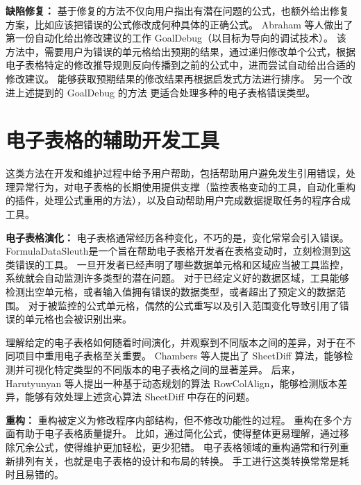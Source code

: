 

\textbf{缺陷修复：}
基于修复的方法不仅向用户指出有潜在问题的公式，也额外给出修复方案，比如应该把错误的公式修改成何种具体的正确公式。
Abraham 等人\cite{abraham2005goal}做出了第一份自动化给出修改建议的工作 GoalDebug（以目标为导向的调试技术）。
该方法中，需要用户为错误的单元格给出预期的结果，通过递归修改单个公式，根据电子表格特定的修改推导规则反向传播到之前的公式中，进而尝试自动给出合适的修改建议。
能够获取预期结果的修改结果再根据启发式方法进行排序。
另一个改进上述提到的 GoalDebug 的方法 \cite{abraham2007goaldebug,abraham2008mutation} 更适合处理多种的电子表格错误类型。



\section{电子表格的辅助开发工具}

这类方法在开发和维护过程中给予用户帮助，包括帮助用户避免发生引用错误，处理异常行为，对电子表格的长期使用提供支撑（监控表格变动的工具，自动化重构的插件，处理公式重用的方法），以及自动帮助用户完成数据提取任务的程序合成工具。

\textbf{电子表格演化：}
电子表格通常经历各种变化，不巧的是，变化常常会引入错误。
FormulaDataSleuth\cite{bekenn2008reducing}是一个旨在帮助电子表格开发者在表格变动时，立刻检测到这类错误的工具。
一旦开发者已经声明了哪些数据单元格和区域应当被工具监控，系统就会自动监测许多类型的潜在问题。
对于已经定义好的数据区域，工具能够检测出空单元格，或者输入值拥有错误的数据类型，或者超出了预定义的数据范围。
对于被监控的公式单元格，偶然的公式重写以及引入范围变化导致引用了错误的单元格也会被识别出来。

理解给定的电子表格如何随着时间演化，并观察到不同版本之间的差异，对于在不同项目中重用电子表格至关重要。
Chambers 等人\cite{chambers2010sheetdiff}提出了 SheetDiff 算法，能够检测并可视化特定类型的不同版本的电子表格之间的显著差异。
后来，Harutyunyan 等人\cite{harutyunyan2012planted}提出一种基于动态规划的算法 RowColAlign，能够检测版本差异，能够有效处理上述贪心算法 SheetDiff 中存在的问题。


\textbf{重构：}
重构被定义为修改程序内部结构，但不修改功能性的过程\cite{o2010spreadsheet}。
重构在多个方面有助于电子表格质量提升。
比如，通过简化公式，使得整体更易理解，通过移除冗余公式，使得维护更加轻松，更少犯错。
电子表格领域的重构通常和行列重新排列有关，也就是电子表格的设计和布局的转换。
手工进行这类转换常常是耗时且易错的。

